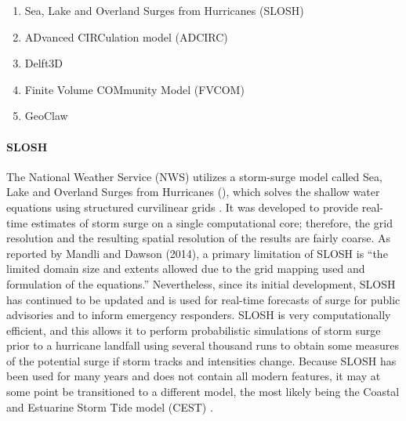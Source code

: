 \begin{enumerate}
    \item Sea, Lake and Overland Surges from Hurricanes  (SLOSH)
    \item ADvanced CIRCulation model (ADCIRC)
    \item Delft3D 
    \item Finite Volume COMmunity Model (FVCOM)
    \item GeoClaw
\end{enumerate}

\paragraph{SLOSH} The National Weather Service (NWS) utilizes a storm-surge model called Sea, Lake and Overland Surges from Hurricanes (), which solves the shallow water equations using structured curvilinear grids \citep{jelesnianski1992NWS48}. It was developed to provide real-time estimates of storm surge on a single computational core; therefore, the grid resolution and the resulting spatial resolution of the results are fairly coarse. As reported by Mandli and Dawson (2014), a primary limitation of SLOSH is ``the limited domain size and extents allowed due to the grid mapping used and formulation of the equations.'' Nevertheless, since its initial development, SLOSH has continued to be updated and is used for real-time forecasts of surge for public advisories and to inform emergency responders. SLOSH is very computationally efficient, and this allows it to perform probabilistic simulations of storm surge prior to a hurricane landfall using several thousand runs to obtain some measures of the potential surge if storm tracks and intensities change. Because SLOSH has been used for many years and does not contain all modern features, it may at some point be transitioned to a different model, the most likely being the Coastal and Estuarine Storm Tide model (CEST) \citep{zhang2017transition}. 

